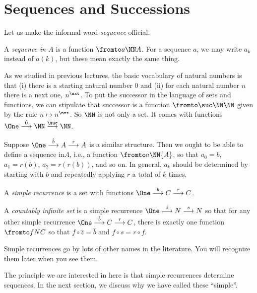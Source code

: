 \section{Sequences and Successions}

Let us make the informal word \emph{sequence} official.

\begin{defn}
	A \emph{sequence in $A$} is a function $\fromto a\NN A$. For a sequence $a$, we may write $a_k$ instead of $a(k)$, but these mean exactly the same thing.
\end{defn}

As we studied in previous lectures, the basic vocabulary of natural numbers is that (i) there is a starting natural number $0$ and (ii) for each natural number $n$ there is a next one, $n^\nxt$. 
To put the successor in the language of sets and functions, we can stipulate that successor is a function $\fromto \suc\NN\NN$ given by the rule $n\mapsto n^\nxt$.
So $\NN$ is not only a set. 
It comes with functions $\One \stackrel{\hat{0}}{\longrightarrow} \NN \stackrel{\suc}{\longrightarrow} \NN$.

Suppose $\One\stackrel{\hat{b}}{\longrightarrow}A\stackrel{r}{\longrightarrow}A$ is a similar structure.
Then we ought to be able to define a sequence in$A$, i.e., a function $\fromto a\NN{A}$, so that $a_0=b$, $a_1=r(b)$, $a_2=r(r(b))$, and so on. 
In general, $a_k$ should be determined by starting with $b$ and repeatedly applying $r$ a total of $k$ times. 

\begin{defn}\label{def:nno}
	A \emph{simple recurrence} is a set with functions $\One\stackrel{\hat{b}}{\longrightarrow}C\stackrel{r}{\longrightarrow}C$.
	
	A \emph{countably infinite set} is a simple recurrence $\One\stackrel{\hat{z}}{\longrightarrow}N\stackrel{s}{\longrightarrow}N$ so that for any other simple recurrence $\One\stackrel{\hat{b}}{\longrightarrow}C\stackrel{r}{\longrightarrow}C$, there is exactly one function $\fromto fNC$ so that $f\circ \hat{z} =\hat b$ and $f\circ s = r\circ f$.
	
	Simple recurrences go by lots of other names in the literature. You will recognize them later when you see them.
\end{defn}

The principle we are interested in here is that simple recurrences determine sequences. In the next section, we discuss why we have called these ``simple''.

